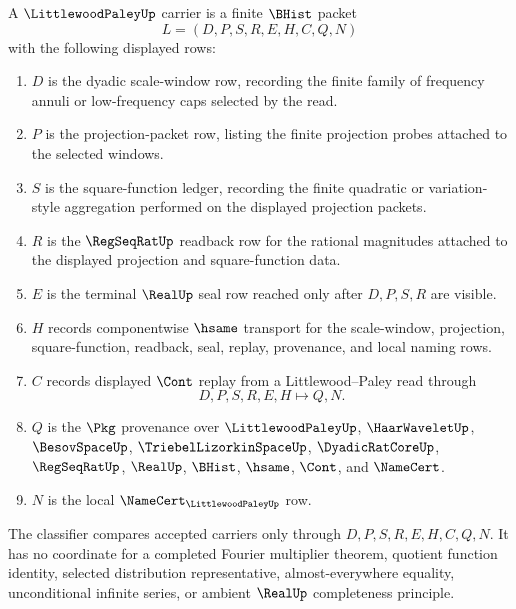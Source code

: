 \begin{definition}
\label{def:littlewood-paley-carrier}
A $\LittlewoodPaleyUp$ carrier is a finite $\BHist$ packet
$$
L=(D,P,S,R,E,H,C,Q,N)
$$
with the following displayed rows:
\begin{enumerate}
\item $D$ is the dyadic scale-window row, recording the finite family of frequency annuli or low-frequency caps selected by the read.
\item $P$ is the projection-packet row, listing the finite projection probes attached to the selected windows.
\item $S$ is the square-function ledger, recording the finite quadratic or variation-style aggregation performed on the displayed projection packets.
\item $R$ is the $\RegSeqRatUp$ readback row for the rational magnitudes attached to the displayed projection and square-function data.
\item $E$ is the terminal $\RealUp$ seal row reached only after $D,P,S,R$ are visible.
\item $H$ records componentwise $\hsame$ transport for the scale-window, projection, square-function, readback, seal, replay, provenance, and local naming rows.
\item $C$ records displayed $\Cont$ replay from a Littlewood--Paley read through
$$
D,P,S,R,E,H \longmapsto Q,N .
$$
\item $Q$ is the $\Pkg$ provenance over $\LittlewoodPaleyUp$, $\HaarWaveletUp$, $\BesovSpaceUp$, $\TriebelLizorkinSpaceUp$, $\DyadicRatCoreUp$, $\RegSeqRatUp$, $\RealUp$, $\BHist$, $\hsame$, $\Cont$, and $\NameCert$.
\item $N$ is the local $\NameCert_{\LittlewoodPaleyUp}$ row.
\end{enumerate}
The classifier compares accepted carriers only through $D,P,S,R,E,H,C,Q,N$. It has no coordinate for a completed Fourier multiplier theorem, quotient function identity, selected distribution representative, almost-everywhere equality, unconditional infinite series, or ambient $\RealUp$ completeness principle.
\end{definition}

